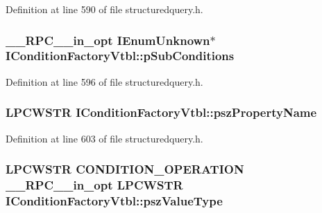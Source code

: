 Definition at line 590 of file structuredquery.\+h.

\subsubsection[{\texorpdfstring{p\+Sub\+Conditions}{pSubConditions}}]{ {\bf \+\_\+\+\_\+\+R\+P\+C\+\_\+\+\_\+in\+\_\+opt} I\+Enum\+Unknown$\ast$ I\+Condition\+Factory\+Vtbl\+::p\+Sub\+Conditions}\hypertarget{struct_i_condition_factory_vtbl_ac40f328853c451396870fade2bb54c3b}{}\label{struct_i_condition_factory_vtbl_ac40f328853c451396870fade2bb54c3b}


Definition at line 596 of file structuredquery.\+h.

\subsubsection[{\texorpdfstring{psz\+Property\+Name}{pszPropertyName}}]{ {\bf L\+P\+C\+W\+S\+TR} I\+Condition\+Factory\+Vtbl\+::psz\+Property\+Name}\hypertarget{struct_i_condition_factory_vtbl_a941fc5dfdd8e57d642179d2e65f17f48}{}\label{struct_i_condition_factory_vtbl_a941fc5dfdd8e57d642179d2e65f17f48}


Definition at line 603 of file structuredquery.\+h.

\subsubsection[{\texorpdfstring{psz\+Value\+Type}{pszValueType}}]{ {\bf L\+P\+C\+W\+S\+TR} {\bf C\+O\+N\+D\+I\+T\+I\+O\+N\+\_\+\+O\+P\+E\+R\+A\+T\+I\+ON} {\bf \+\_\+\+\_\+\+R\+P\+C\+\_\+\+\_\+in\+\_\+opt} {\bf L\+P\+C\+W\+S\+TR} I\+Condition\+Factory\+Vtbl\+::psz\+Value\+Type}\hypertarget{struct_i_condition_factory_vtbl_a3c85af137fed728957056c51c9057cb5}{}\label{struct_i_condition_factory_vtbl_a3c85af137fed728957056c51c9057cb5}


